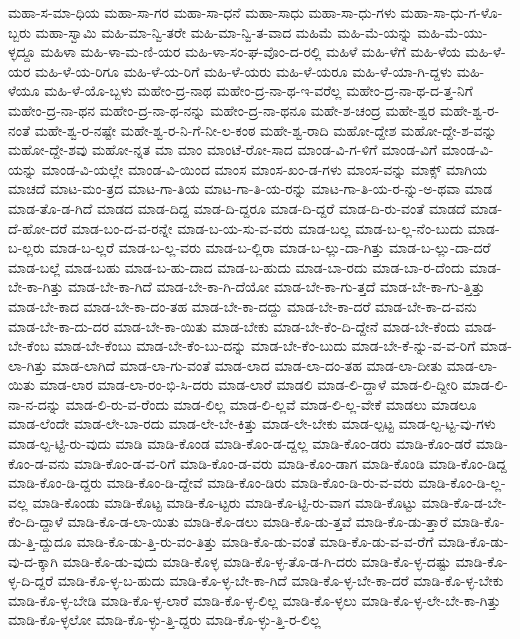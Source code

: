 {ಮಹಾ-ಸ-ಮಾ-ಧಿಯ
ಮಹಾ-ಸಾ-ಗರ
ಮಹಾ-ಸಾ-ಧನೆ
ಮಹಾ-ಸಾಧು
ಮಹಾ-ಸಾ-ಧು-ಗಳು
ಮಹಾ-ಸಾ-ಧು-ಗ-ಳೊ-ಬ್ಬರು
ಮಹಾ-ಸ್ವಾಮಿ
ಮಹಿ-ಮಾ-ನ್ವಿ-ತರೇ
ಮಹಿ-ಮಾ-ನ್ವಿ-ತ-ವಾದ
ಮಹಿಮೆ
ಮಹಿ-ಮೆ-ಯನ್ನು
ಮಹಿ-ಮೆ-ಯು-ಳ್ಳದ್ದೂ
ಮಹಿಳಾ
ಮಹಿ-ಳಾ-ಮ-ಣಿ-ಯರ
ಮಹಿ-ಳಾ-ಸಂ-ಘ-ವೊಂ-ದ-ರಲ್ಲಿ
ಮಹಿಳೆ
ಮಹಿ-ಳೆಗೆ
ಮಹಿ-ಳೆಯ
ಮಹಿ-ಳೆ-ಯರ
ಮಹಿ-ಳೆ-ಯ-ರಿಗೂ
ಮಹಿ-ಳೆ-ಯ-ರಿಗೆ
ಮಹಿ-ಳೆ-ಯರು
ಮಹಿ-ಳೆ-ಯರೂ
ಮಹಿ-ಳೆ-ಯಾ-ಗಿ-ದ್ದಳು
ಮಹಿ-ಳೆಯೂ
ಮಹಿ-ಳೆ-ಯೊ-ಬ್ಬಳು
ಮಹೇಂ-ದ್ರ-ನಾಥ
ಮಹೇಂ-ದ್ರ-ನಾ-ಥ-ಇ-ವರೆಲ್ಲ
ಮಹೇಂ-ದ್ರ-ನಾ-ಥ-ದ-ತ್ತ-ನಿಗೆ
ಮಹೇಂ-ದ್ರ-ನಾ-ಥನ
ಮಹೇಂ-ದ್ರ-ನಾ-ಥ-ನನ್ನು
ಮಹೇಂ-ದ್ರ-ನಾ-ಥನೂ
ಮಹೇ-ಶ-ಚಂದ್ರ
ಮಹೇ-ಶ್ವರ
ಮಹೇ-ಶ್ವ-ರ-ನಂತೆ
ಮಹೇ-ಶ್ವ-ರ-ನಷ್ಟೇ
ಮಹೇ-ಶ್ವ-ರ-ನಿ-ಗೆ-ನೀ-ಲ-ಕಂಠ
ಮಹೇ-ಶ್ವ-ರಾದಿ
ಮಹೋ-ದ್ದೇಶ
ಮಹೋ-ದ್ದೇ-ಶ-ವನ್ನು
ಮಹೋ-ದ್ದೇ-ಶವು
ಮಹೋ-ನ್ನತ
ಮಾ
ಮಾಂ
ಮಾಂಟೆ-ರೋ-ಸಾದ
ಮಾಂಡ-ವಿ-ಗ-ಳಿಗೆ
ಮಾಂಡ-ವಿಗೆ
ಮಾಂಡ-ವಿ-ಯನ್ನು
ಮಾಂಡ-ವಿ-ಯಲ್ಲೇ
ಮಾಂಡ-ವಿ-ಯಿಂದ
ಮಾಂಸ
ಮಾಂಸ-ಖಂ-ಡ-ಗಳು
ಮಾಂಸ-ವನ್ನು
ಮಾಕ್ಸ್
ಮಾಗಿಯ
ಮಾಚದೆ
ಮಾಟ-ಮಂ-ತ್ರದ
ಮಾಟ-ಗಾ-ತಿಯ
ಮಾಟ-ಗಾ-ತಿ-ಯ-ರನ್ನು
ಮಾಟ-ಗಾ-ತಿ-ಯ-ರ-ನ್ನು-ಅ-ಥವಾ
ಮಾಡ
ಮಾಡ-ತೊ-ಡ-ಗಿದೆ
ಮಾಡದ
ಮಾಡ-ದಿದ್ದ
ಮಾಡ-ದಿ-ದ್ದರೂ
ಮಾಡ-ದಿ-ದ್ದರೆ
ಮಾಡ-ದಿ-ರು-ವಂತೆ
ಮಾಡದೆ
ಮಾಡ-ದೆ-ಹೋ-ದರೆ
ಮಾಡ-ಬಂ-ದ-ವ-ರನ್ನೇ
ಮಾಡ-ಬ-ಯ-ಸು-ವ-ವರು
ಮಾಡ-ಬಲ್ಲ
ಮಾಡ-ಬ-ಲ್ಲ-ನೆಂ-ಬುದು
ಮಾಡ-ಬ-ಲ್ಲರು
ಮಾಡ-ಬ-ಲ್ಲರೆ
ಮಾಡ-ಬ-ಲ್ಲ-ವರು
ಮಾಡ-ಬ-ಲ್ಲಿರಾ
ಮಾಡ-ಬ-ಲ್ಲು-ದಾ-ಗಿತ್ತು
ಮಾಡ-ಬ-ಲ್ಲು-ದಾ-ದರೆ
ಮಾಡ-ಬಲ್ಲೆ
ಮಾಡ-ಬಹು
ಮಾಡ-ಬ-ಹು-ದಾದ
ಮಾಡ-ಬ-ಹುದು
ಮಾಡ-ಬಾ-ರದು
ಮಾಡ-ಬಾ-ರ-ದೆಂದು
ಮಾಡ-ಬೇ-ಕಾ-ಗಿತ್ತು
ಮಾಡ-ಬೇ-ಕಾ-ಗಿದೆ
ಮಾಡ-ಬೇ-ಕಾ-ಗಿ-ದೆಯೋ
ಮಾಡ-ಬೇ-ಕಾ-ಗು-ತ್ತದೆ
ಮಾಡ-ಬೇ-ಕಾ-ಗು-ತ್ತಿತ್ತು
ಮಾಡ-ಬೇ-ಕಾದ
ಮಾಡ-ಬೇ-ಕಾ-ದಂ-ತಹ
ಮಾಡ-ಬೇ-ಕಾ-ದದ್ದು
ಮಾಡ-ಬೇ-ಕಾ-ದರೆ
ಮಾಡ-ಬೇ-ಕಾ-ದ-ವನು
ಮಾಡ-ಬೇ-ಕಾ-ದು-ದರ
ಮಾಡ-ಬೇ-ಕಾ-ಯಿತು
ಮಾಡ-ಬೇಕು
ಮಾಡ-ಬೇ-ಕೆಂ-ದಿ-ದ್ದೇನೆ
ಮಾಡ-ಬೇ-ಕೆಂದು
ಮಾಡ-ಬೇ-ಕೆಂಬ
ಮಾಡ-ಬೇ-ಕೆಂಬು
ಮಾಡ-ಬೇ-ಕೆಂ-ಬು-ದನ್ನು
ಮಾಡ-ಬೇ-ಕೆಂ-ಬುದು
ಮಾಡ-ಬೇ-ಕೆ-ನ್ನು-ವ-ವ-ರಿಗೆ
ಮಾಡ-ಲಾ-ಗಿತ್ತು
ಮಾಡ-ಲಾಗಿದೆ
ಮಾಡ-ಲಾ-ಗು-ವಂತೆ
ಮಾಡ-ಲಾದ
ಮಾಡ-ಲಾ-ದಂ-ತಹ
ಮಾಡ-ಲಾ-ದೀತು
ಮಾಡ-ಲಾ-ಯಿತು
ಮಾಡ-ಲಾರ
ಮಾಡ-ಲಾ-ರಂ-ಭಿ-ಸಿ-ದರು
ಮಾಡ-ಲಾರೆ
ಮಾಡಲಿ
ಮಾಡ-ಲಿ-ದ್ದಾಳೆ
ಮಾಡ-ಲಿ-ದ್ದೀರಿ
ಮಾಡ-ಲಿ-ನಾ-ನ-ದನ್ನು
ಮಾಡ-ಲಿ-ರು-ವ-ರೆಂದು
ಮಾಡ-ಲಿಲ್ಲ
ಮಾಡ-ಲಿ-ಲ್ಲವೆ
ಮಾಡ-ಲಿ-ಲ್ಲ-ವೇಕೆ
ಮಾಡಲು
ಮಾಡಲೂ
ಮಾಡ-ಲೆಂದೇ
ಮಾಡ-ಲೇ-ಬಾ-ರದು
ಮಾಡ-ಲೇ-ಬೇ-ಕಿತ್ತು
ಮಾಡ-ಲೇ-ಬೇಕು
ಮಾಡ-ಲ್ಪಟ್ಟ
ಮಾಡ-ಲ್ಪ-ಟ್ಟ-ವು-ಗಳು
ಮಾಡ-ಲ್ಪ-ಟ್ಟಿ-ರು-ವುದು
ಮಾಡಿ
ಮಾಡಿ-ಕೊಂಡ
ಮಾಡಿ-ಕೊಂ-ಡ-ದ್ದಲ್ಲ
ಮಾಡಿ-ಕೊಂ-ಡರು
ಮಾಡಿ-ಕೊಂ-ಡರೆ
ಮಾಡಿ-ಕೊಂ-ಡ-ವನು
ಮಾಡಿ-ಕೊಂ-ಡ-ವ-ರಿಗೆ
ಮಾಡಿ-ಕೊಂ-ಡ-ವರು
ಮಾಡಿ-ಕೊಂ-ಡಾಗ
ಮಾಡಿ-ಕೊಂಡಿ
ಮಾಡಿ-ಕೊಂ-ಡಿದ್ದ
ಮಾಡಿ-ಕೊಂ-ಡಿ-ದ್ದರು
ಮಾಡಿ-ಕೊಂ-ಡಿ-ದ್ದೇವೆ
ಮಾಡಿ-ಕೊಂ-ಡಿರು
ಮಾಡಿ-ಕೊಂ-ಡಿ-ರು-ವ-ವರು
ಮಾಡಿ-ಕೊಂ-ಡಿ-ಲ್ಲ-ವಲ್ಲ
ಮಾಡಿ-ಕೊಂಡು
ಮಾಡಿ-ಕೊಟ್ಟ
ಮಾಡಿ-ಕೊ-ಟ್ಟರು
ಮಾಡಿ-ಕೊ-ಟ್ಟಿ-ರು-ವಾಗ
ಮಾಡಿ-ಕೊಟ್ಟು
ಮಾಡಿ-ಕೊ-ಡ-ಬೇ-ಕೆಂ-ದಿ-ದ್ದಾಳೆ
ಮಾಡಿ-ಕೊ-ಡ-ಲಾ-ಯಿತು
ಮಾಡಿ-ಕೊ-ಡಲು
ಮಾಡಿ-ಕೊ-ಡು-ತ್ತವೆ
ಮಾಡಿ-ಕೊ-ಡು-ತ್ತಾರೆ
ಮಾಡಿ-ಕೊ-ಡು-ತ್ತಿ-ದ್ದುದೂ
ಮಾಡಿ-ಕೊ-ಡು-ತ್ತಿ-ರು-ವಂ-ತಿತ್ತು
ಮಾಡಿ-ಕೊ-ಡು-ವಂತೆ
ಮಾಡಿ-ಕೊ-ಡು-ವ-ವ-ರೆಗೆ
ಮಾಡಿ-ಕೊ-ಡು-ವು-ದ-ಕ್ಕಾಗಿ
ಮಾಡಿ-ಕೊ-ಡು-ವುದು
ಮಾಡಿ-ಕೊಳ್ಳ
ಮಾಡಿ-ಕೊ-ಳ್ಳ-ತೊ-ಡ-ಗಿ-ದರು
ಮಾಡಿ-ಕೊ-ಳ್ಳ-ದಷ್ಟು
ಮಾಡಿ-ಕೊ-ಳ್ಳ-ದಿ-ದ್ದರೆ
ಮಾಡಿ-ಕೊ-ಳ್ಳ-ಬ-ಹುದು
ಮಾಡಿ-ಕೊ-ಳ್ಳ-ಬೇ-ಕಾ-ಗಿದೆ
ಮಾಡಿ-ಕೊ-ಳ್ಳ-ಬೇ-ಕಾ-ದರೆ
ಮಾಡಿ-ಕೊ-ಳ್ಳ-ಬೇಕು
ಮಾಡಿ-ಕೊ-ಳ್ಳ-ಬೇಡಿ
ಮಾಡಿ-ಕೊ-ಳ್ಳ-ಲಾರೆ
ಮಾಡಿ-ಕೊ-ಳ್ಳ-ಲಿಲ್ಲ
ಮಾಡಿ-ಕೊ-ಳ್ಳಲು
ಮಾಡಿ-ಕೊ-ಳ್ಳ-ಲೇ-ಬೇ-ಕಾ-ಗಿತ್ತು
ಮಾಡಿ-ಕೊ-ಳ್ಳಲೋ
ಮಾಡಿ-ಕೊ-ಳ್ಳು-ತ್ತಿ-ದ್ದರು
ಮಾಡಿ-ಕೊ-ಳ್ಳು-ತ್ತಿ-ರ-ಲಿಲ್ಲ
}
